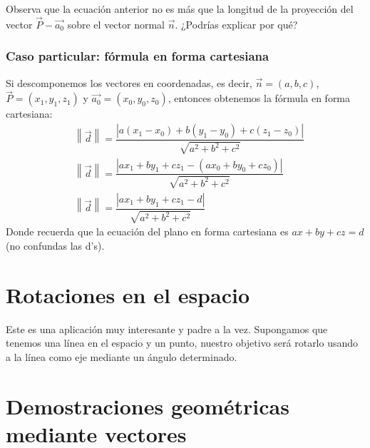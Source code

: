 \documentclass[12pt, fleqn]{report}                             %
\theoremstyle{break}                                            %
\newcommand{\abs}[1]{\left\lvert #1 \right\lvert}               %
\newcommand{\Abs}[1]{\left\lVert #1 \right\lVert}               %
\newcommand{\lVec}[1]{\overrightarrow{#1}}                      %
\begin{document}
        Observa que la ecuación anterior no es más que la longitud de la proyección del vector $\vec{P} - \lVec{a_0}$ sobre el vector normal $\vec{n}$. ¿Podrías explicar por qué?
        
	        \subsubsection{Caso particular: fórmula en forma cartesiana}
	        
	        Si descomponemos los vectores en coordenadas, es decir, $\vec{n}=(a,b,c)$, $\vec{P}=(x_1, y_1, z_1)$ y $\lVec{a_0}=(x_0, y_0, z_0)$, entonces obtenemos la fórmula en forma cartesiana:
	        \begin{align}
		        &\Abs{\vec{d}} = \dfrac{\abs{a(x_1 - x_0) + b(y_1 - y_0) + c(z_1 - z_0)}}{\sqrt{a^2+b^2+c^2}} \nonumber \\
		        &\Abs{\vec{d}} = \dfrac{\abs{ax_1 + by_1 + cz_1 - (ax_0 + by_0 + cz_0)}}{\sqrt{a^2+b^2+c^2}} \nonumber \\
		        &\Abs{\vec{d}} = \dfrac{\abs{ax_1 + by_1 + cz_1 - d}}{\sqrt{a^2+b^2+c^2}}
	        \end{align}
	        Donde recuerda que la ecuación del plano en forma cartesiana es $ax+by+cz=d$ (no confundas las d's).
	        
	    \clearpage
	    
        
        \section{Rotaciones en el espacio}
        
        Este es una aplicación muy interesante y padre a la vez. Supongamos que tenemos una línea en el espacio y un punto, nuestro objetivo será rotarlo usando a la línea como eje mediante un ángulo determinado.
        
        
        
        
        \section{Demostraciones geométricas mediante vectores}
        
\end{document}
